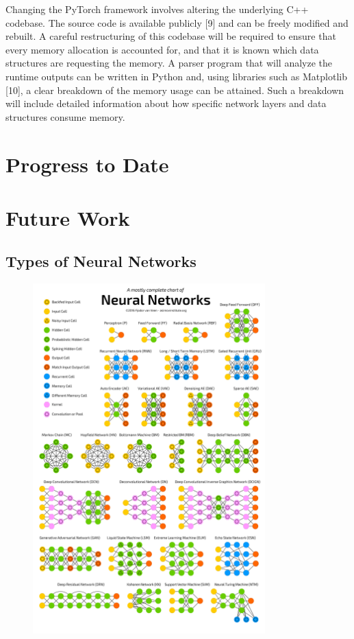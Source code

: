 \documentclass[12pt,letterpaper]{article}
\begin{document}
Changing the PyTorch framework involves altering the underlying C++ codebase. The source code is available publicly [9] and can be freely modified and rebuilt. A careful restructuring of this codebase will be required to ensure that every memory allocation is accounted for, and that it is known which data structures are requesting the memory. A parser program that will analyze the runtime outputs can be written in Python and, using libraries such as Matplotlib [10], a clear breakdown of the memory usage can be attained. Such a breakdown will include detailed information about how specific network layers and data structures consume memory.

\section{Progress to Date}
\label{progress_to_date}

\section{Future Work}
\label{future_work}


\newpage
\begin{appendices}
\section{Types of Neural Networks}
\label{appendix:types_of_networks}
\begin{figure}[ht]
\centering
\includegraphics[width=0.8\textwidth]{types_of_NN.png}
\end{figure}
\end{appendices}



\newpage
\printbibliography
\end{document}
